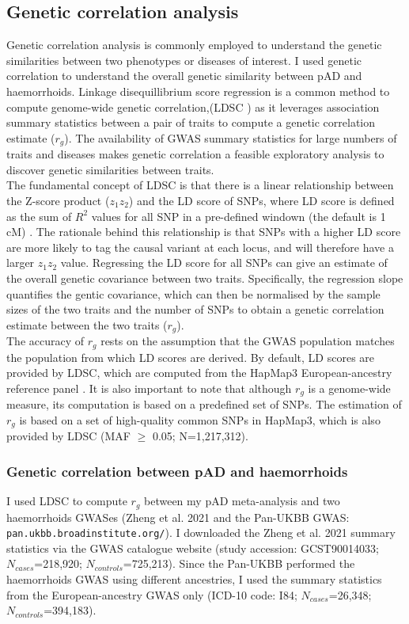 \subsection{Genetic correlation analysis}
Genetic correlation analysis is commonly employed to understand the genetic similarities between two phenotypes or diseases of interest. I used genetic correlation to understand the overall genetic similarity between pAD and haemorrhoids. Linkage disequillibrium score regression is a common method to compute genome-wide genetic correlation,(LDSC \cite{Bulik-Sullivan2015-fk}) as it leverages association summary statistics between a pair of traits to compute a genetic correlation estimate ($r_{g}$). The availability of GWAS summary statistics for large numbers of traits and diseases makes genetic correlation a feasible exploratory analysis to discover genetic similarities between traits.\\

The fundamental concept of LDSC is that there is a linear relationship between the Z-score product ($z_{1}z_{2}$) and the LD score of SNPs, where LD score is defined as the sum of $R^{2}$ values for all SNP in a pre-defined windown (the default is 1 cM) \cite{Bulik-Sullivan2015-ts}. The rationale behind this relationship is that SNPs with a higher LD score are more likely to tag the causal variant at each locus, and will therefore have a larger $z_{1}z_{2}$ value. Regressing the LD score for all SNPs can give an estimate of the overall genetic covariance between two traits. Specifically, the regression slope quantifies the gentic covariance, which can then be normalised by the sample sizes of the two traits and the number of SNPs to obtain a genetic correlation estimate between the two traits ($r_{g}$).\\

The accuracy of $r_{g}$ rests on the assumption that the GWAS population matches the population from which LD scores are derived. By default, LD scores are provided by LDSC, which are computed from the HapMap3 European-ancestry reference panel \cite{hapmap}. It is also important to note that although $r_{g}$ is a genome-wide measure, its computation is based on a predefined set of SNPs. The estimation of $r_{g}$ is based on a set of high-quality common SNPs in HapMap3, which is also provided by LDSC (MAF $\geq$ 0.05; N=1,217,312).

\subsubsection{Genetic correlation between pAD and haemorrhoids}
I used LDSC to compute $r_{g}$ between my pAD meta-analysis and two haemorrhoids GWASes (Zheng et al. 2021 \cite{Zheng2021-ss} and the Pan-UKBB GWAS: \Verb+pan.ukbb.broadinstitute.org/+). I downloaded the Zheng et al. 2021 summary statistics via the GWAS catalogue website (study accession: GCST90014033; $N_{cases}$=218,920; $N_{controls}$=725,213). Since the Pan-UKBB performed the haemorrhoids GWAS using different ancestries, I used the summary statistics from the European-ancestry GWAS only (ICD-10 code: I84; $N_{cases}$=26,348; $N_{controls}$=394,183). \\

